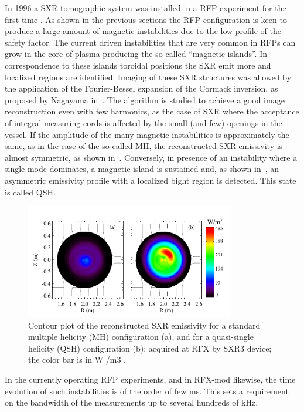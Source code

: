 In 1996 a SXR tomographic system was installed in a RFP experiment for the first time \cite{Franz_2001}. 
As shown in the previous sections the RFP configuration is keen to produce a large amount of
magnetic instabilities due to the low profile of the safety factor. The current driven instabilities that are very common in RFPs can grow in the core of plasma producing the so called ``magnetic islands''. In correspondence to these islands toroidal positions the SXR emit more and localized regions
are identified. 
Imaging of these SXR structures was allowed by the application of the Fourier-Bessel expansion of the Cormack inversion, as proposed by Nagayama in~\cite{Bonomo25}. 
The algorithm is studied to achieve a good image reconstruction even with few harmonics, as the case of SXR where the acceptance of integral measuring cords  is affected by the small (and few) openings in the vessel. If the amplitude of the many magnetic instabilities is approximately the same, as in the case of the so-called \acl{MH}, the reconstructed SXR emissivity is almost symmetric, as shown in~. Conversely, in presence of an instability where a single mode dominates, a magnetic island is sustained and, as shown in~, an asymmetric emissivity profile with a localized bight region is detected. This state is called \acl{QSH}.
%
\begin{figure}
    \centering
    \includegraphics[height=5cm]{img/2_eq/MH_QSH_example.png}
    \caption{Contour plot of the reconstructed SXR emissivity for a standard multiple helicity (MH) configuration (a), and for a quasi-single helicity (QSH) configuration (b); acquired at RFX by SXR3 device; the color bar is in W /m3 .
    }
    \label{fig:MH_QSH_example}
\end{figure}
%
In the currently operating RFP experiments, and in RFX-mod likewise, the time evolution of such instabilities is of the order of few ms. This sets a requirement on the bandwidth of the measurements up to several hundreds of kHz.

